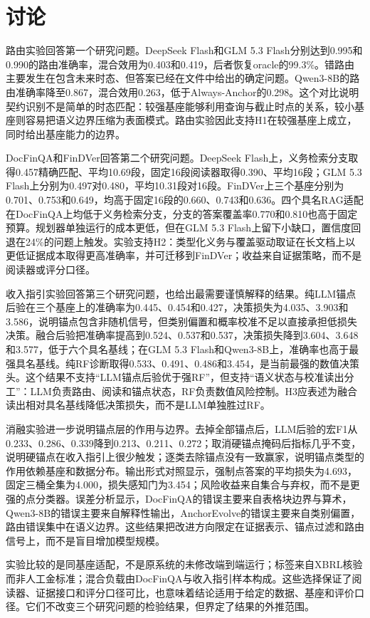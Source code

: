 \section{讨论}

路由实验回答第一个研究问题。DeepSeek Flash和GLM 5.3 Flash分别达到0.995和0.990的路由准确率，混合效用为0.403和0.419，后者恢复oracle的99.3\%。错路由主要发生在包含未来时态、但答案已经在文件中给出的确定问题。Qwen3-8B的路由准确率降至0.867，混合效用0.263，低于Always-Anchor的0.298。这个对比说明契约识别不是简单的时态匹配：较强基座能够利用查询与截止时点的关系，较小基座则容易把语义边界压缩为表面模式。路由实验因此支持H1在较强基座上成立，同时给出基座能力的边界。

DocFinQA和FinDVer回答第二个研究问题。DeepSeek Flash上，义务检索分支取得0.457精确匹配、平均10.69段，固定16段阅读器取得0.390、平均16段；GLM 5.3 Flash上分别为0.497对0.480，平均10.31段对16段。FinDVer上三个基座分别为0.701、0.753和0.649，均高于固定16段的0.660、0.743和0.636。四个具名RAG适配在DocFinQA上均低于义务检索分支，分支的答案覆盖率0.770和0.810也高于固定预算。规划器单独运行的成本更低，但在GLM 5.3 Flash上留下小缺口，置信度回退在24\%的问题上触发。实验支持H2：类型化义务与覆盖驱动取证在长文档上以更低证据成本取得更高准确率，并可迁移到FinDVer；收益来自证据策略，而不是阅读器或评分口径。

收入指引实验回答第三个研究问题，也给出最需要谨慎解释的结果。纯LLM锚点后验在三个基座上的准确率为0.445、0.454和0.427，决策损失为4.035、3.903和3.586，说明锚点包含非随机信号，但类别偏置和概率校准不足以直接承担低损失决策。融合后验把准确率提高到0.524、0.537和0.537，决策损失降到3.604、3.648和3.577，低于六个具名基线；在GLM 5.3 Flash和Qwen3-8B上，准确率也高于最强具名基线。纯RF诊断取得0.533、0.491、0.486和3.454，是当前最强的数值决策头。这个结果不支持“LLM锚点后验优于强RF”，但支持“语义状态与校准读出分工”：LLM负责路由、阅读和锚点状态，RF负责数值风险控制。H3应表述为融合读出相对具名基线降低决策损失，而不是LLM单独胜过RF。

消融实验进一步说明锚点层的作用与边界。去掉全部锚点后，LLM后验的宏F1从0.233、0.286、0.339降到0.213、0.211、0.272；取消硬锚点掩码后指标几乎不变，说明硬锚点在收入指引上很少触发；逐类去除锚点没有一致赢家，说明锚点类型的作用依赖基座和数据分布。输出形式对照显示，强制点答案的平均损失为4.693，固定三桶全集为4.000，损失感知门为3.454；风险收益来自集合与弃权，而不是更强的点分类器。误差分析显示，DocFinQA的错误主要来自表格块边界与算术，Qwen3-8B的错误主要来自解释性输出，AnchorEvolve的错误主要来自类别偏置，路由错误集中在语义边界。这些结果把改进方向限定在证据表示、锚点过滤和路由信号上，而不是盲目增加模型规模。

实验比较的是同基座适配，不是原系统的未修改端到端运行；标签来自XBRL核验而非人工金标准；混合负载由DocFinQA与收入指引样本构成。这些选择保证了阅读器、证据接口和评分口径可比，也意味着结论适用于给定的数据、基座和评价口径。它们不改变三个研究问题的检验结果，但界定了结果的外推范围。
